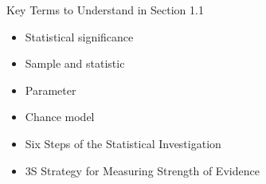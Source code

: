 \documentclass[13pt]{beamer}
\begin{document}
\begin{frame}{Key Terms to Understand in Section 1.1}
\begin{multicols}{2}
\begin{itemize}
	\item Statistical significance
	\item Sample and statistic
    \item Parameter
    \item Chance model
    \item Six Steps of the Statistical Investigation 
    \item 3S Strategy for Measuring Strength of Evidence
\end{itemize}
\end{multicols}
\end{frame}
\end{document}
